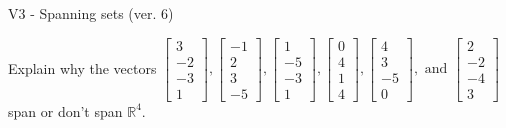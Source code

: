 \begin{exercise}
  \begin{exerciseTitle}V3 - Spanning sets (ver. 6)\end{exerciseTitle}
  \begin{exerciseStatement}
    Explain why the vectors \(\left[\begin{array}{r}
3 \\
-2 \\
-3 \\
1
\end{array}\right] , \left[\begin{array}{r}
-1 \\
2 \\
3 \\
-5
\end{array}\right] , \left[\begin{array}{r}
1 \\
-5 \\
-3 \\
1
\end{array}\right] , \left[\begin{array}{r}
0 \\
4 \\
1 \\
4
\end{array}\right] , \left[\begin{array}{r}
4 \\
3 \\
-5 \\
0
\end{array}\right] , \text{ and } \left[\begin{array}{r}
2 \\
-2 \\
-4 \\
3
\end{array}\right]\) span or don't span \(\mathbb{R}^4\). 
	



\end{exerciseStatement}
\end{exercise}
